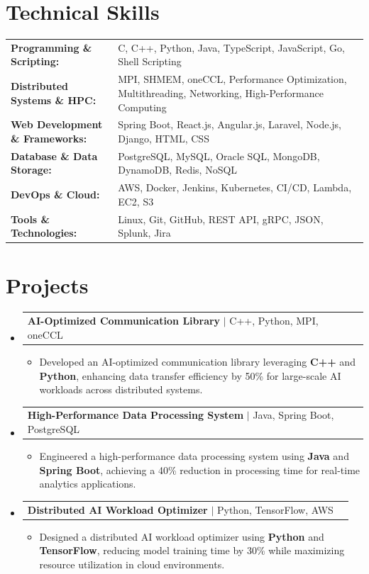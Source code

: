 \documentclass[letterpaper,10pt]{article}
\makeatletter
\newcommand{\resumeItem}[1]{
  \item{\fontsize{8pt}{9pt}\selectfont
    #1 \vspace{-3pt}
  }
}
\newcommand{\resumeProjectHeading}[2]{
    \item
    \begin{tabular*}{1.001\textwidth}{l@{\extracolsep{\fill}}r}
      \fontsize{8.5pt}{10pt}#1 & \textbf{\fontsize{8.5pt}{10pt} #2}\\
    \end{tabular*}\vspace{-7pt}
}
\newcommand{\resumeSubHeadingListStart}{\begin{itemize}[leftmargin=0pt, label={}]}
\newcommand{\resumeSubHeadingListEnd}{\end{itemize}}
\newcommand{\resumeItemListStart}{\begin{itemize}[leftmargin=*]}
\newcommand{\resumeItemListEnd}{\end{itemize}\vspace{-5pt}}
\makeatother
\begin{document}
\section{Technical Skills}
        \vspace{-14pt}
        \begin{table}[h]
            \fontsize{8pt}{9pt}\selectfont
            \begin{tabular}{p{0.3\linewidth} p{0.7\linewidth}}
                \textbf{Programming \& Scripting:} & C, C++, Python, Java, TypeScript, JavaScript, Go, Shell Scripting \\
                \textbf{Distributed Systems \& HPC:} & MPI, SHMEM, oneCCL, Performance Optimization, Multithreading, Networking, High-Performance Computing \\
                \textbf{Web Development \& Frameworks:} & Spring Boot, React.js, Angular.js, Laravel, Node.js, Django, HTML, CSS \\
                \textbf{Database \& Data Storage:} & PostgreSQL, MySQL, Oracle SQL, MongoDB, DynamoDB, Redis, NoSQL \\
                \textbf{DevOps \& Cloud:} & AWS, Docker, Jenkins, Kubernetes, CI/CD, Lambda, EC2, S3 \\
                \textbf{Tools \& Technologies:} & Linux, Git, GitHub, REST API, gRPC, JSON, Splunk, Jira \\
            \end{tabular}
        \end{table}
 \vspace{-18pt}

\section{Projects}
    \vspace{-5pt}
    \resumeSubHeadingListStart
          \resumeProjectHeading
            {\textbf{AI-Optimized Communication Library} $|$ C++, Python, MPI, oneCCL}{}
            \resumeItemListStart
                \resumeItem{Developed an AI-optimized communication library leveraging \textbf{C++} and \textbf{Python}, enhancing data transfer efficiency by 50\% for large-scale AI workloads across distributed systems.}
            \resumeItemListEnd
        \vspace{-12pt}
    
        \resumeProjectHeading
            {\textbf{High-Performance Data Processing System} $|$ Java, Spring Boot, PostgreSQL}{}
        \resumeItemListStart
                \resumeItem{Engineered a high-performance data processing system using \textbf{Java} and \textbf{Spring Boot}, achieving a 40\% reduction in processing time for real-time analytics applications.}
        \resumeItemListEnd
      \vspace{-12pt}
      \resumeProjectHeading
        {\textbf{Distributed AI Workload Optimizer} $|$ Python, TensorFlow, AWS}{}
    \resumeItemListStart
            \resumeItem{Designed a distributed AI workload optimizer using \textbf{Python} and \textbf{TensorFlow}, reducing model training time by 30\% while maximizing resource utilization in cloud environments.}
    \resumeItemListEnd
    \resumeSubHeadingListEnd
\end{document}
